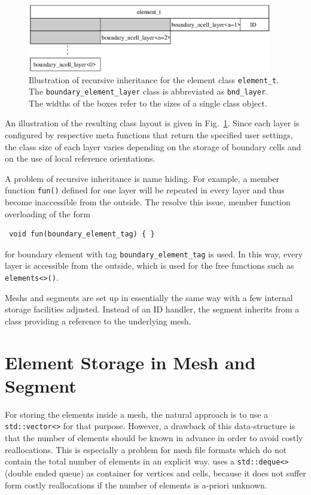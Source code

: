 \begin{figure}[tb]
\centering
 \includegraphics[width=0.95\textwidth]{figures/recursive-inheritance.eps}
 \caption{Illustration of recursive inheritance for the element class \lstinline|element_t|. The \lstinline|boundary_element_layer| class is abbreviated as \lstinline|bnd_layer|. The widths of the boxes refer to the sizes of a single class object.}
 \label{fig:recursive-inheritance}
\end{figure}
An illustration of the resulting class layout is given in Fig.~\ref{fig:recursive-inheritance}.
Since each layer is configured by respective meta functions that return the specified user settings,
the class size of each layer varies depending on the storage of boundary cells and on the use of local reference orientations.

A problem of recursive inheritance is name hiding. For example, a member function \lstinline|fun()| defined for one layer
will be repeated in every layer and thus become inaccessible from the outside. The resolve this issue, member function overloading of the form
\begin{lstlisting}
 void fun(boundary_element_tag) { }
\end{lstlisting}
for boundary element with tag \lstinline|boundary_element_tag| is used. In this way, every layer is accessible from the outside, which is used for the free functions such as \lstinline|elements<>()|.

Meshs and segments are set up in essentially the same way with a few internal storage facilities adjusted.
Instead of an ID handler, the segment inherits from a class providing a reference to the underlying mesh.

\section{Element Storage in Mesh and Segment}
For storing the elements inside a mesh, the natural approach is to use a \lstinline|std::vector<>| for that purpose.
However, a drawback of this data-structure is that the number of elements should be known in advance in order to avoid
costly reallocations. This is especially a problem for mesh file formats which do not contain the total number of elements in an explicit way.
{\ViennaGrid} uses a \lstinline|std::deque<>| (double ended queue) as container for vertices and cells, because it does not suffer form costly reallocations
if the number of elements is a-priori unknown.

